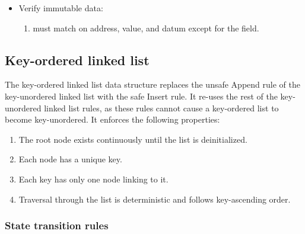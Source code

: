 \documentclass[../midgard.tex]{subfiles}
\begin{document}
\begin{description}
\begin{itemize}
            \item Verify immutable data:
            \begin{enumerate}[resume]
                \item {} must match  on address, value, and datum except for the  field.
            \end{enumerate}
        \end{itemize}
\end{description}

\subsection{Key-ordered linked list}
\label{h:key-ordered-list}

The key-ordered linked list data structure replaces the unsafe Append rule of the key-unordered linked list with the safe Insert rule.
It re-uses the rest of the key-unordered linked list rules, as these rules cannot cause a key-ordered list to become key-unordered.
It enforces the following properties:
\begin{enumerate}
    \item The root node exists continuously until the list is deinitialized.
    \item Each node has a unique key.
    \item Each key has only one node linking to it.
    \item Traversal through the list is deterministic and follows key-ascending order.
\end{enumerate}

\subsubsection{State transition rules}
\label{h:key-ordered-list-state-transition-rules}
\end{document}
